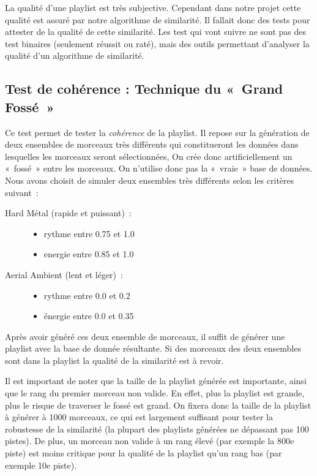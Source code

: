 La qualité d'une playlist est très subjective. Cependant dans notre projet cette
qualité est assuré par notre algorithme de similarité. Il fallait donc des tests
pour attester de la qualité de cette similarité. Les test qui vont suivre ne
sont pas des test binaires (seulement réussit ou raté), mais des outils
permettant d'analyser la qualité d'un algorithme de similarité.

\subsection{Test de cohérence : Technique du «~Grand Fossé~»}
\label{tests:qualite:coherence-fosse}

Ce test permet de tester la \emph{cohérence} de la playlist. Il repose sur la
génération de deux ensembles de morceaux très différents qui constitueront les
données dans lesquelles les morceaux seront sélectionnées, On crée donc
artificiellement un «~fossé~» entre les morceaux. On n'utilise donc pas la
«~vraie~» base de données. Nous avons choisit de simuler deux ensembles très
différents selon les critères suivant~:

\begin{description}

\item[Hard Métal (rapide et puissant)~:] \hfill
\begin{itemize}
  \item rythme entre 0.75 et 1.0
  \item energie entre 0.85 et 1.0
\end{itemize}

\item[Aerial Ambient (lent et léger)~:] \hfill
\begin{itemize}
  \item rythme entre 0.0 et 0.2
  \item énergie entre 0.0 et 0.35
\end{itemize}

\end{description}

Après avoir généré ces deux ensemble de morceaux, il suffit de générer une
playlist avec la base de donnée résultante. Si des morceaux des deux ensembles
sont dans la playlist la qualité de la similarité est à revoir.

Il est important de noter que la taille de la playlist générée est importante,
ainsi que le rang du premier morceau non valide. En effet, plus la playlist est
grande, plus le risque de traverser le fossé est grand. On fixera donc la taille
de la playlist à générer à 1000 morceaux, ce qui est largement suffisant pour
tester la robustesse de la similarité (la plupart des playlists générées ne
dépassant pas 100 pistes). De plus, un morceau non valide à un rang élevé (par
exemple la 800e piste) est moins critique pour la qualité de la playlist qu'un
rang bas (par exemple 10e piste).

